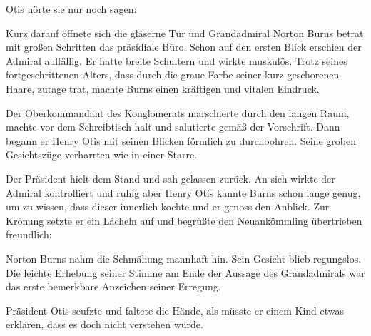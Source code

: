 Otis hörte sie nur noch sagen: 

\par

Kurz darauf öffnete sich die gläserne Tür und Grandadmiral Norton Burns betrat mit großen Schritten das präsidiale Büro. Schon auf den ersten Blick erschien der Admiral auffällig. Er hatte breite Schultern und wirkte muskulös. Trotz seines fortgeschrittenen Alters, dass durch die graue Farbe seiner kurz geschorenen Haare, zutage trat, machte Burns einen kräftigen und vitalen Eindruck.

\par

Der Oberkommandant des Konglomerats marschierte durch den langen Raum, machte vor dem Schreibtisch halt und salutierte gemäß der Vorschrift. Dann begann er Henry Otis mit seinen Blicken förmlich zu durchbohren. Seine groben Gesichtszüge verharrten wie in einer Starre.

\par

Der Präsident hielt dem Stand und sah gelassen zurück. An sich wirkte der Admiral kontrolliert und ruhig aber Henry Otis kannte Burns schon lange genug, um zu wissen, dass dieser innerlich kochte und er genoss den Anblick. Zur Krönung setzte er ein Lächeln auf und begrüßte den Neuankömmling übertrieben freundlich: 

\par

Norton Burns nahm die Schmähung mannhaft hin. Sein Gesicht blieb regungslos.  Die leichte Erhebung seiner Stimme am Ende der Aussage des Grandadmirals war das erste bemerkbare Anzeichen seiner Erregung.

\par

Präsident Otis seufzte und faltete die Hände, als müsste er einem Kind etwas erklären, dass es doch nicht verstehen würde. 

\par

